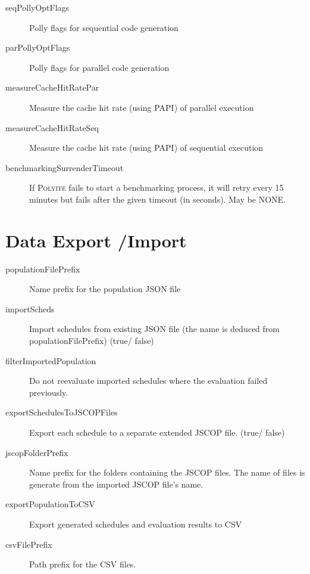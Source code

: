 \documentclass{article}
\begin{document}
\begin{description}
      \item[seqPollyOptFlags] Polly flags for sequential code generation
      \item[parPollyOptFlags] Polly flags for parallel code generation
      \item[measureCacheHitRatePar] Measure the cache hit rate (using PAPI) of parallel execution
      \item[measureCacheHitRateSeq] Measure the cache hit rate (using PAPI) of sequential execution
      \item[benchmarkingSurrenderTimeout] If \textsc{Polyite} fails to start a benchmarking
      process, it will retry every 15 minutes but fails after the given timeout (in seconds). May be NONE.
    \end{description}

    \section{Data Export /Import}
    \begin{description}
      \item[populationFilePrefix] Name prefix for the population JSON file
      \item[importScheds] Import schedules from existing JSON file (the name is
      deduced from populationFilePrefix) (true/ false)
      \item[filterImportedPopulation] Do not reevaluate imported schedules where
      the evaluation failed previously.

      \item[exportSchedulesToJSCOPFiles] Export each schedule to a separate extended JSCOP file. (true/ false)
      \item[jscopFolderPrefix] Name prefix for the folders containing the JSCOP files. The name of files is generate
      from the imported JSCOP file's name.
      \item[exportPopulationToCSV] Export generated schedules and evaluation results to CSV
      \item[csvFilePrefix] Path prefix for the CSV files.
    \end{description}
\end{document}
